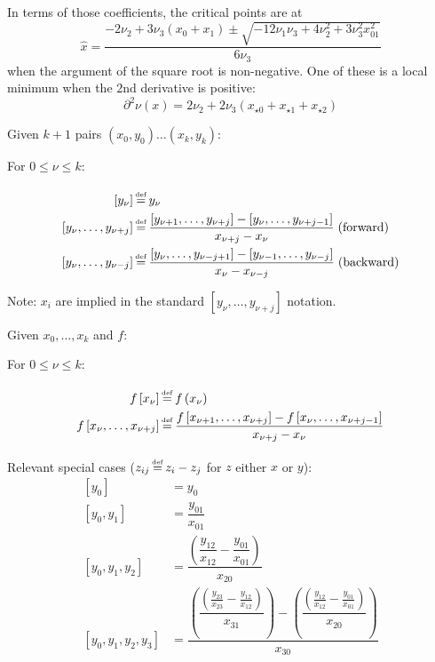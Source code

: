 In terms of those coefficients, the critical points are at
\begin{equation}
\hat{x} = \frac{-2 \nu_2 + 3 \nu_3 \left( x_0 + x_1 \right) 
\pm \sqrt{-12 \nu_1 \nu_3 + 4 \nu_2^{2} + 3 \nu_3^{2} x_{01}^{2}}
}
{ 6 \nu_3}
\end{equation}
when the argument of the square root is non-negative.
One of these is a local minimum when the $2$nd derivative is positive:
\begin{equation}
\partial^2 \nu(x) = 2\nu_2
 + 2 \nu_3 \left(x_{{\star}0} + x_{{\star}1} + x_{{\star}2}\right)
\end{equation}

\newpage
\setcounter{currentlevel}{\value{baseSectionLevel}}
\label{sec:Divided-differences}
\cite{wiki:Divided-differences}
Given $k+1$ pairs 
$\left( x_0, y_0 \right) \ldots \left( x_k, y_k \right) $:

For $0 \leq \nu \leq k$:

\begin{align}
\left[ y_{\nu} \right] & \operatorname*{\overset{\underset{\mathrm{def}}{}}{=}} y_{\nu}
\\
\left[ y_{\nu}, \ldots , y_{\nu + j} \right] & \operatorname*{\overset{\underset{\mathrm{def}}{}}{=}} 
\frac{
\left[ y_{\nu + 1}, \ldots ,  y_{\nu + j} \right]
-
\left[ y_{\nu}, \ldots ,  y_{\nu + j - 1} \right]
}{
x_{\nu + j} - x_{\nu}
} 
\; \text{(forward)}
\nonumber
\\
\left[ y_{\nu}, \ldots , y_{\nu - j} \right] & \operatorname*{\overset{\underset{\mathrm{def}}{}}{=}} 
\frac{
\left[ y_{\nu}, \ldots ,  y_{\nu - j + 1} \right]
-
\left[ y_{\nu - 1}, \ldots ,  y_{\nu - j} \right]
}{
x_{\nu} - x_{\nu - j}
} 
\; \text{(backward)}
\nonumber
\end{align}

Note: $x_i$ are implied in the standard 
$\left[ y_{\nu}, \ldots , y_{\nu + j} \right]$ notation.

Given $x_0, \ldots , x_k$ and $f$:

For $0 \leq \nu \leq k$:

\begin{align}
f \left[ x_{\nu} \right] & \operatorname*{\overset{\underset{\mathrm{def}}{}}{=}} f \left( x_{\nu} \right)
\\
f \left[ x_{\nu}, \ldots , x_{\nu + j} \right] & \operatorname*{\overset{\underset{\mathrm{def}}{}}{=}} 
\frac{
f \left[ x_{\nu + 1}, \ldots ,  x_{\nu + j} \right]
-
f \left[ x_{\nu}, \ldots ,  x_{\nu + j - 1} \right]
}{
x_{\nu + j} - x_{\nu}
} 
\nonumber
\end{align}

Relevant special cases ($z_{ij} \operatorname*{\overset{\underset{\mathrm{def}}{}}{=}} z_i - z_j$ for $z$ 
either $x$ or $y$): 
\begin{align}
\left[ y_0 \right] & = y_0 
\\
\left[ y_0 , y_1  \right] & = 
\dfrac{y_{01}}{x_{01}} 
\nonumber
\\
\left[ y_0 , y_1 , y_2 \right] & = 
\dfrac{
\left( \dfrac{y_{12}}{x_{12}} - \dfrac{y_{01}}{x_{01}} \right)
}{
x_{20}
} 
\nonumber
\\
\left[ y_0 , y_1 , y_2 , y_3 \right] & = 
\dfrac{
 \left(
 \dfrac{
 \left(
  \frac{y_{23}}{x_{23}} - \frac{y_{12}}{x_{12}}
  \right)
  }{x_{31}}
  \right)
 -
 \left(
 \dfrac{
 \left(
  \frac{y_{12}}{x_{12}} - \frac{y_{01}}{x_{01}}
  \right)
  }{x_{20}}
  \right)
}{
x_{30}
} 
\nonumber
\end{align}
